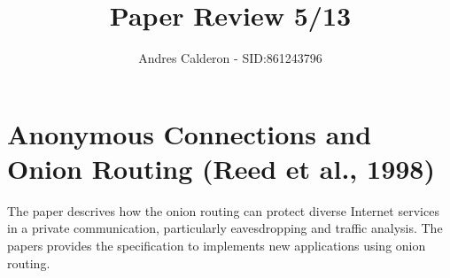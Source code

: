\documentclass[a4paper,10pt]{scrartcl}
\title{Paper Review 5/13}
\author{Andres Calderon - SID:861243796}
\begin{document}
\maketitle
\thispagestyle{empty}

\section*{Anonymous Connections and Onion Routing (Reed et al., 1998)}
The paper descrives how the onion routing can protect diverse Internet services in a private communication, particularly eavesdropping and traffic analysis.  The papers provides the specification to implements new applications using onion routing.

\end{document}
